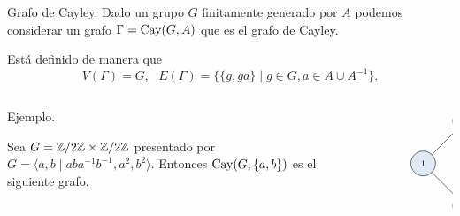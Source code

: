 \documentclass[aspectratio=169, 11pt]{beamer}
\begin{document}
	\begin{frame}[fragile]{Grafo de Cayley.}
		Dado un grupo $G$ finitamente generado por $A$ podemos considerar un grafo $\Gamma =\text{Cay}(G, A)$ que es el grafo de Cayley.

		Está definido de manera que 
		\[
			V(\Gamma) = G,   \ \ \ E(\Gamma) = \{ \{ g,ga \}  \mid g \in G, a \in A \cup A^{-1}  \}. 	
		\]


	\begin{columns}
		\begin{column}{0.4\textwidth}
			\begin{alertblock}{Ejemplo.}

				Sea $G = \mathbb{Z}/2\mathbb{Z} \times \mathbb{Z}/2\mathbb{Z}$ presentado por 
				$G = \langle a,b \mid aba^{-1}b^{-1}, a^{2}, b^{2}\rangle$. Entonces $\text{Cay}(G, \{a,b\})$ es el siguiente grafo.
			\end{alertblock}
		\end{column}
		\begin{column}{0.6\textwidth}
			\[
				\begin{tikzpicture}
				[scale=0.60,V/.style = {circle, draw,align= center, minimum size=0.5cm,
					minimum size=2em,inner sep=2,
					 fill=astral!15,font=\scriptsize	},fill fraction/.style={path picture={
							\fill[#1] 
							(path picture bounding box.south) rectangle
							(path picture bounding box.north west);
					}},
					fill fraction/.default=astral!90
					]
			\node[align=center] at (2, -6) {};
				\begin{scope}[nodes=V,xshift=4.5cm, yshift=-4cm]
						\node (1) at (0,0) {$1$};
						\node (a) at (2,2)  {$a$};
						\node (b) at (2,-2)     {$b$};
						\node (ab) at (4,0)    {$ab$};
				\end{scope}
				
				\draw   (1)  edge[-] (a);
				\draw   (1)  edge[-] (b);
				\draw   (a)  edge[-] (ab);
				\draw   (b)  edge[-] (ab);
		\end{tikzpicture}
		\]
		\end{column}
	\end{columns}
	
			
	
\end{frame}
	
\end{document}
